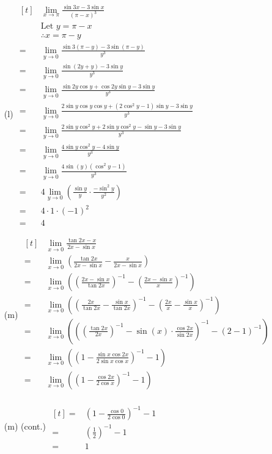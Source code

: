 \documentclass{article}
\begin{document}
\begin{multicols}{2}
\begin{itemize}
\item[(l)] 
$\begin{aligned}[t]
	&\lim\limits_{x\to\pi}\frac{\sin3x-3\sin x}{\left(\pi-x\right)^3} \\
	&\text{Let }y=\pi-x \\
	&\therefore x=\pi-y \\
	=&\lim\limits_{y\to0}\frac{\sin3\left(\pi-y\right)-3\sin\left(\pi-y\right)}{y^3} \\
	=&\lim\limits_{y\to0}\frac{\sin\left(2y+y\right)-3\sin y}{y^3} \\
	=&\lim\limits_{y\to0}\frac{\sin2y\cos y+\cos2y\sin y-3\sin y}{y^3} \\
	=&\lim\limits_{y\to0}\frac{2\sin y\cos y\cos y+\left(2\cos^2y-1\right)\sin y-3\sin y}{y^3} \\
	=&\lim\limits_{y\to0}\frac{2\sin y\cos^2y+2\sin y\cos^2y-\sin y-3\sin y}{y^3} \\
	=&\lim\limits_{y\to0}\frac{4\sin y\cos^2y-4\sin y}{y^3} \\
	=&\lim\limits_{y\to0}\frac{4\sin\left(y\right)\left(\cos^2y-1\right)}{y^3} \\
	=&4\lim\limits_{y\to0}\left(\frac{\sin y}{y}\cdot\frac{-\sin^2y}{y^2}\right) \\
	=&4\cdot1\cdot\left(-1\right)^2 \\
	=&\boxed{4}
\end{aligned}$

\item[(m)] 
$\begin{aligned}[t]
	&\lim\limits_{x\to0}\frac{\tan2x-x}{2x-\sin x} \\
	=&\lim\limits_{x\to0}\left(\frac{\tan2x}{2x-\sin x}-\frac{x}{2x-\sin x}\right) \\
	=&\lim\limits_{x\to0}\left(\left(\frac{2x-\sin x}{\tan2x}\right)^{-1}-\left(\frac{2x-\sin x}{x}\right)^{-1}\right) \\
	=&\lim\limits_{x\to0}\left(\left(\frac{2x}{\tan2x}-\frac{\sin x}{\tan2x}\right)^{-1}-\left(\frac{2x}{x}-\frac{\sin x}{x}\right)^{-1}\right) \\
	=&\lim\limits_{x\to0}\left(\left(\left(\frac{\tan2x}{2x}\right)^{-1}-\sin\left(x\right)\cdot\frac{\cos2x}{\sin2x}\right)^{-1}-\left(2-1\right)^{-1}\right) \\
	=&\lim\limits_{x\to0}\left(\left(1-\frac{\sin x\cos2x}{2\sin x\cos x}\right)^{-1}-1\right) \\
	=&\lim\limits_{x\to0}\left(\left(1-\frac{\cos2x}{2\cos x}\right)^{-1}-1\right) \\
\end{aligned}$
\item[(m) (cont.)] 
$\begin{aligned}[t]
	=&\left(1-\frac{\cos0}{2\cos0}\right)^{-1}-1 \\
	=&\left(\frac{1}{2}\right)^{-1}-1 \\
	=&\boxed{1}
\end{aligned}$


\end{itemize}
\end{multicols}
\end{document}
